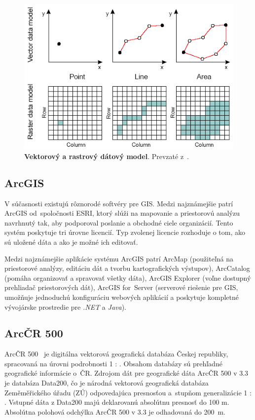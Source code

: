 \begin{figure}[ht]
    \centering
    \includegraphics[width=0.5\linewidth]{obrazky-figures/vector-and-raster-data.png}
    \caption{\textbf{Vektorový a rastrový dátový model}. Prevzaté z~\cite{jukil2017mapdata}.}
    \label{fig:vectorandraster}
\end{figure}

\subsection*{ArcGIS}
V súčasnosti existujú rôznorodé softvéry pre GIS. Medzi najznámejšie patrí ArcGIS od~spoločnosti ESRI, ktorý slúži na mapovanie a priestorovú analýzu navrhnutý tak, aby podporoval poslanie a obchodné ciele organizácií. Tento systém poskytuje tri úrovne licencií. Typ zvolenej licencie rozhoduje o tom, ako sú uložené dáta a ako je možné ich editovať. 

Medzi najznámejšie aplikácie systému ArcGIS patrí ArcMap (použiteľná na priestorové analýzy, editáciu dát a tvorbu kartografických výstupov), ArcCatalog (pomáha organizovať a spravovať všetky dáta), ArcGIS Explorer (voľne dostupný prehliadač priestorových dát), ArcGIS for~Server (serverové riešenie pre GIS, umožňuje jednoduchú konfiguráciu webových aplikácií a poskytuje kompletné vývojárske prostredie pre \emph{.NET} a \emph{Java}).

\subsection*{ArcČR 500}
ArcČR 500~\cite{arcgis} je digitálna vektorová geografická databáza Českej republiky, spracovaná na úrovni podrobnosti 1 : . Obsahom databázy sú prehľadné geografické informácie o~ČR. Zdrojom dát pre geografické dáta ArcČR 500 v 3.3 je databáza Data200, čo je národná vektorová geografická databáza Zeměměřického úřadu (ZÚ) odpovedajúca presnosťou a~stupňom generalizácie 1 : . Vstupné dáta z Data200 majú deklarovanú absolútnu presnosť do 100 m. Absolútna polohová odchýlka ArcČR 500 v 3.3 je odhadovaná do 200~m.

